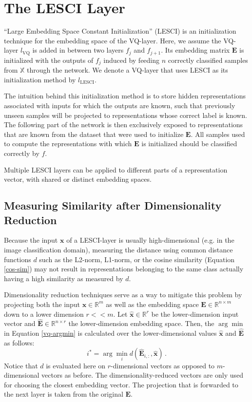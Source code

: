 \documentclass{article}
\begin{document}
\section{The LESCI Layer}

\enquote{Large Embedding Space Constant Initialization} (LESCI) is an initialization technique for the embedding space of the VQ-layer.
Here, we assume the VQ-layer $l_{\text{VQ}}$ is added in between two layers $f_j$ and $f_{j+1}$.
Its embedding matrix $\bm{E}$ is initialized with the outputs of $f_j$ induced by feeding $n$ correctly classified samples from $\mathbb{X}$ through the network.
We denote a VQ-layer that uses LESCI as its initialization method by $l_\text{LESCI}$.

The intuition behind this initialization method is to store hidden representations associated with inputs for which the outputs are known, such that previously unseen samples will be projected to representations whose correct label is known.
The following part of the network is then exclusively exposed to representations that are known from the dataset that were used to initialize $\bm{E}$.
All samples used to compute the representations with which $\bm{E}$ is initialized should be classified correctly by $f$.

Multiple LESCI layers can be applied to different parts of a representation vector, with shared or distinct embedding spaces.

\subsection{Measuring Similarity after Dimensionality Reduction}
Because the input $\bm{x}$ of a LESCI-layer is usually high-dimensional (e.g. in the image classification domain), measuring the distance using common distance functions $d$ such as the L2-norm, L1-norm, or the cosine similarity (Equation \ref{cos-sim}) may not result in representations belonging to the same class actually having a high similarity as measured by $d$.

Dimensionality reduction techniques serve as a way to mitigate this problem by projecting both the input $\bm{x} \in \mathbb{R}^m$ as well as the embedding space $\bm{E} \in \mathbb{R}^{n \times m}$ down to a lower dimension $r << m$.
Let $\bm{\hat{x}} \in \mathbb{R}^r$ be the lower-dimension input vector and $\bm{\hat{E}} \in \mathbb{R}^{n \times r}$ the lower-dimension embedding space. Then, the $\arg\min$ in Equation \ref{vq-argmin} is calculated over the lower-dimensional values $\bm{\hat{x}}$ and $\bm{\hat{E}}$ as follows:
\begin{equation}
    i^*=\arg\min_i d\left(\bm{\hat{E}}_{i,:},\bm{\hat{x}}\right)\,.
\end{equation}
Notice that $d$ is evaluated here on $r$-dimensional vectors as opposed to $m$-dimensional vectors as before.
The dimensionality-reduced vectors are only used for choosing the closest embedding vector.
The projection that is forwarded to the next layer is taken from the original $\bm{E}$.
\end{document}
